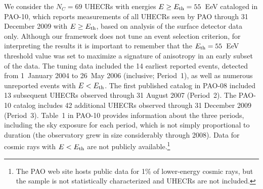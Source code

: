 We consider the $N_C = 69$ UHECRs with energies $E \geq E_{\rm th} = 55$~EeV
cataloged in PAO-10, which reports measurements of all UHECRs seen by PAO
through 31 December 2009 with $E \geq E_{\rm th}$, based on analysis of the
surface detector data only.  Although our framework does not tune an event
selection criterion, for interpreting the results it is important to
remember that the $E_{\rm th}=55$~EeV threshold value was set to maximize a
signature of anisotropy in an early subset of the data.
The tuning data included the 14 earliest
reported events, detected from 1~January 2004 to 26~May 2006 (inclusive;
Period~1), as well as numerous unreported events with $E<E_{\rm th}$.  The first
published catalog in PAO-08 included 13 subsequent UHECRs observed through 31
August 2007 (Period~2).  The PAO-10 catalog includes 42 additional UHECRs
observed through 31 December 2009 (Period~3). Table~1 in PAO-10 provides
information about the three periods, including the sky exposure for each
period, which is not simply proportional to duration (the observatory grew in
size considerably through 2008).  Data for cosmic rays with $E < E_{\rm th}$ are not
publicly available.\footnote{The PAO web site hosts public data for 1\% of
lower-energy cosmic rays, but the sample is not statistically characterized
and UHECRs are not included.}

